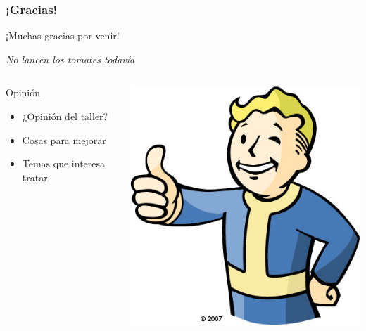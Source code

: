 \begin{frame}
	\frametitle{¡Gracias!}
	
	\begin{center}
    \huge{¡Muchas gracias por venir!}
    \end{center}
		
    \begin{center}
        \emph{No lancen los tomates todavía}
    \end{center}
    
	\begin{columns}[c]
	\column{200pt}	
	
	\begin{block}{Opinión}
        \begin{itemize}
            \item ¿Opinión del taller?
            \item Cosas para mejorar
            \item Temas que interesa tratar
        \end{itemize}
    \end{block}
	
	\column{100pt}
	\begin{center}
	    \includegraphics[scale=0.3]{img/thumbs-up.jpg}
	\end{center}   
    
    \end{columns}  
	
\end{frame}

